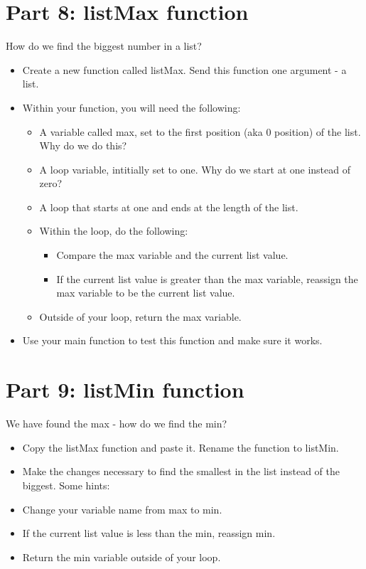 \documentclass{article}
\begin{document}
\section*{Part 8: listMax function}
How do we find the biggest number in a list?
\begin{itemize}
	\item Create a new function called listMax.  Send this function one argument - a list.
	\item Within your function, you will need the following:
	\begin{itemize}
		\item A variable called max, set to the first position (aka 0 position) of the list.  Why do we do this?
		\item A loop variable, intitially set to one.  Why do we start at one instead of zero?
		\item A loop that starts at one and ends at the length of the list.
		\item Within the loop, do the following:
		\begin{itemize}
			\item Compare the max variable and the current list value.  
			\item If the current list value is greater than the max variable, reassign the max variable to be the current list value.
		\end{itemize}
		\item Outside of your loop, return the max variable.
	\end{itemize}
	\item Use your main function to test this function and make sure it works.
\end{itemize}

\section*{Part 9: listMin function}
We have found the max - how do we find the min?
\begin{itemize}
	\item  Copy the listMax function and paste it.  Rename the function to listMin.
	\item Make the changes necessary to find the smallest in the list instead of the biggest.  Some hints:
	\item Change your variable name from max to min.
	\item If the current list value is less than the min, reassign min.
	\item Return the min variable outside of your loop.
\end{itemize}
\end{document}
